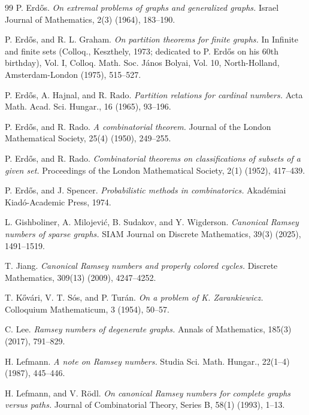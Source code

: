 \documentclass[10pt,a4paper]{article}
\theoremstyle{plain}
\theoremstyle{definition}
\begin{document}
\begin{thebibliography}{99}
P. Erd{\H{o}}s.
\emph{On extremal problems of graphs and generalized graphs.}
Israel Journal of Mathematics, 2(3) (1964), 183--190.

P. Erd{\H{o}}s, and R. L. Graham.
\emph{On partition theorems for finite graphs.}
In Infinite and finite sets (Colloq., Keszthely, 1973; dedicated to P. Erd{\H{o}}s on his 60th birthday), Vol. I, Colloq. Math. Soc. J{\'a}nos Bolyai, Vol. 10, North-Holland, Amsterdam-London (1975), 515--527.

P. Erd{\H{o}}s, A. Hajnal, and R. Rado.
\emph{Partition relations for cardinal numbers.}
Acta Math. Acad. Sci. Hungar., 16 (1965), 93--196.

P. Erd{\H{o}}s, and R. Rado.
\emph{A combinatorial theorem.}
Journal of the London Mathematical Society, 25(4) (1950), 249--255.

P. Erd\H{o}s, and R. Rado.
\emph{Combinatorial theorems on classifications of subsets of a given set.}
Proceedings of the London Mathematical Society, 2(1) (1952), 417--439.

P. Erd{\H{o}}s, and J. Spencer.
\emph{Probabilistic methods in combinatorics.}
Akad{\'e}miai Kiad{\'o}-Academic Press, 1974.

L. Gishboliner, A. Milojevi{\'c}, B. Sudakov, and Y. Wigderson.
\emph{Canonical Ramsey numbers of sparse graphs.}
SIAM Journal on Discrete Mathematics, 39(3) (2025), 1491--1519.

T. Jiang.
\emph{Canonical Ramsey numbers and properly colored cycles.}
Discrete Mathematics, 309(13) (2009), 4247--4252.

T. K{\H{o}}v{\'a}ri, V. T. S{\'o}s, and P. Tur{\'a}n.
\emph{On a problem of K. Zarankiewicz.}
Colloquium Mathematicum, 3 (1954), 50--57.

C. Lee.
\emph{Ramsey numbers of degenerate graphs.}
Annals of Mathematics, 185(3) (2017), 791--829.

H. Lefmann.
\emph{A note on Ramsey numbers.}
Studia Sci. Math. Hungar., 22(1--4) (1987), 445--446.

H. Lefmann, and V. R{\"o}dl.
\emph{On canonical Ramsey numbers for complete graphs versus paths.}
Journal of Combinatorial Theory, Series B, 58(1) (1993), 1--13.


\end{thebibliography}
\end{document}

